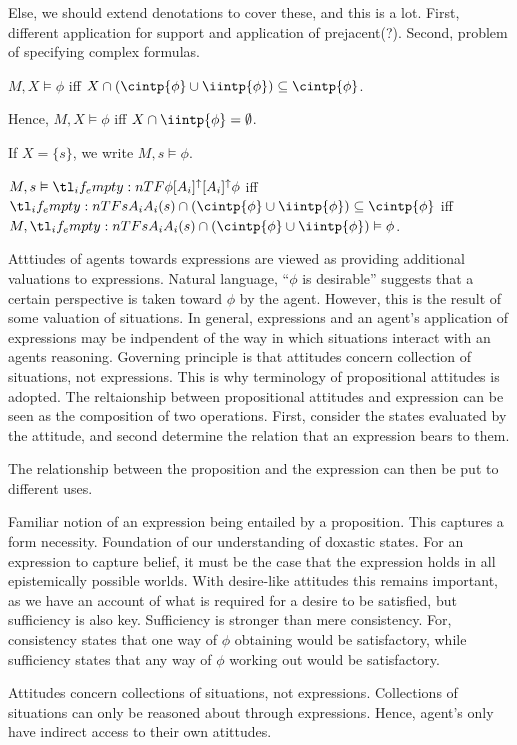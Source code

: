 \documentclass[10pt]{article}
\begin{document}
Else, we should extend denotations to cover these, and this is a lot.
First, different application for support and application of prejacent(?).
Second, problem of specifying complex formulas.

\begin{definition}[Support]
  \(M,X \vDash \phi\) iff \(X \cap (\cintp{\phi} \cup \iintp{\phi}) \subseteq \cintp{\phi}\).

  Hence, \(M,X \vDash \phi\) iff \(X \cap \iintp{\phi} = \emptyset\).

  If \(X = \{s\}\), we write \(M,s \vDash \phi\).

  \(M,s \vDash \lattu{\phi}\) iff \(\fatt{s} \cap (\cintp{\phi} \cup \iintp{\phi}) \subseteq \cintp{\phi}\) iff \(M,\fatt{s} \cap (\cintp{\phi} \cup \iintp{\phi}) \vDash \phi\).
\end{definition}

Atttiudes of agents towards expressions are viewed as providing additional valuations to expressions.
Natural language, ``\(\phi\) is desirable'' suggests that a certain perspective is taken toward \(\phi\) by the agent.
However, this is the result of some valuation of situations.
In general, expressions and an agent's application of expressions may be indpendent of the way in which situations interact with an agents reasoning.
Governing principle is that attitudes concern collection of situations, not expressions.
This is why terminology of propositional attitudes is adopted.
The reltaionship between propositional attitudes and expression can be seen as the composition of two operations.
First, consider the states evaluated by the attitude, and second determine the relation that an expression bears to them.

The relationship between the proposition and the expression can then be put to different uses.

Familiar notion of an expression being entailed by a proposition.
This captures a form necessity.
Foundation of our understanding of doxastic states.
For an expression to capture belief, it must be the case that the expression holds in all epistemically possible worlds.
With desire-like attitudes this remains important, as we have an account of what is required for a desire to be satisfied, but sufficiency is also key.
Sufficiency is stronger than mere consistency.
For, consistency states that one way of \(\phi\) obtaining would be satisfactory, while sufficiency states that any way of \(\phi\) working out would be satisfactory.

Attitudes concern collections of situations, not expressions.
Collections of situations can only be reasoned about through expressions.
Hence, agent's only have indirect access to their own atittudes.
\end{document}
